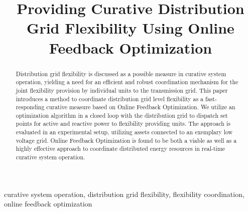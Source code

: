 \documentclass[conference,a4paper]{IEEEtran}
\begin{document}
\title{Providing Curative Distribution Grid Flexibility Using Online Feedback Optimization}

\author{
    }

\maketitle

\IEEEpubidadjcol

\begin{abstract}
Distribution grid flexibility is discussed as a possible measure in curative system operation, yielding a need for an efficient and robust coordination mechanism for the joint flexibility provision by individual units to the transmission grid. This paper introduces a method to coordinate distribution grid level flexibility as a fast-responding curative measure based on Online Feedback Optimization. We utilize an optimization algorithm in a closed loop with the distribution grid to dispatch set points for active and reactive power to flexibility providing units. The approach is evaluated in an experimental setup, utilizing assets connected to an exemplary low voltage grid. Online Feedback Optimization is found to be both a viable as well as a highly effective approach to coordinate distributed energy resources in real-time curative system operation.
\end{abstract}

\begin{IEEEkeywords}
curative system operation, distribution grid flexibility, flexibility coordination, online feedback optimization
\end{IEEEkeywords}
\end{document}
